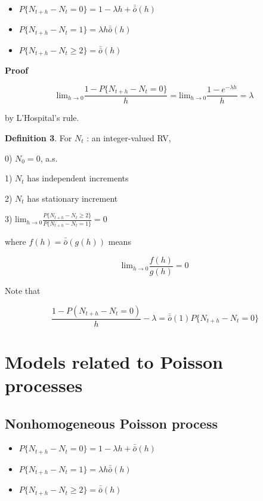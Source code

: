 \documentclass[12pt]{article}
\theoremstyle{nonumberbreak}
\begin{document}
\begin{theorem}
\begin{itemize}
	\item $P\{ N_{t+h} - N_t = 0 \} = 1 - \lambda h + \bar{\bar{o}}(h)$
	\item $P\{ N_{t+h} - N_t = 1 \} = \lambda h \bar{\bar{o}}(h)$
	\item $P\{ N_{t+h} - N_t \ge 2 \} = \bar{\bar{o}}(h)$
\end{itemize}
\end{theorem}

\textbf{Proof} 

$$
\mathrm{lim}_{h \to 0} \frac{1 - P\{ N_{t+h} - N_t = 0 \}}{h} = \mathrm{lim}_{h \to 0} \frac{1-e^{-\lambda h}}{h} = \lambda
$$

by L'Hospital's rule.


\begin{theorem}
\textbf{Definition 3}. For $N_t$ : an integer-valued RV,
	\item 0) $N_0 = 0$, a.s.
	\item 1) $N_t$ has independent increments
	\item 2) $N_t$ has stationary increment 
	\item 3) $\mathrm{lim}_{h \to 0} \frac{P\{ N_{t+h} - N_t \ge 2 \}}{P\{ N_{t+h} - N_t = 1 \}} = 0 $
\end{theorem}


where $f(h) = \bar{\bar{o}} (g(h))$ means

$$
\mathrm{lim}_{h\to0} \frac{f(h)}{g(h)} = 0
$$ 

Note that 

$$
\frac{1 - P(N_{t+h} - N_t = 0) }{h} - \lambda = \bar{\bar{o}} (1) P\{ N_{t+h} - N_t = 0 \}
$$



\pagebreak
\section{Models related to Poisson processes}

\subsection{Nonhomogeneous Poisson process}


\begin{itemize}
	\item $P\{ N_{t+h} - N_t = 0 \} = 1 - \lambda h + \bar{\bar{o}}(h)$
	\item $P\{ N_{t+h} - N_t = 1 \} = \lambda h \bar{\bar{o}}(h)$
	\item $P\{ N_{t+h} - N_t \ge 2 \} = \bar{\bar{o}}(h)$
\end{itemize}
\end{document}
